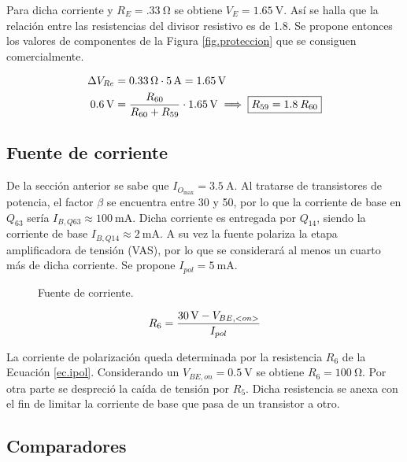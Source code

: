	Para dicha corriente y $R_{E} = \SI{.33}{\ohm}$ se obtiene $V_{E} = \SI{1.65}{\V}$. Así se halla que la relación entre las resistencias del divisor resistivo es de \num{1,8}. Se propone entonces los valores de componentes de la Figura \ref{fig.proteccion} que se consiguen comercialmente.

	\begin{align}
		\centering
		\Delta V_{Re} &= \SI{0.33}{\ohm} \cdot \SI{5}{\ampere} = \SI{1.65}{\volt} \\
		\SI{0.6}{\volt} &= \frac{R_{60}}{ R_{60} + R_{59} } \cdot \SI{1.65}{\volt} \implies \boxed{R_{59} = \num{1,8} \: R_{60}}
	\end{align}

		

\subsection{Fuente de corriente}
	De la sección anterior se sabe que $I_{O_{\max}}=\SI{3.5}{\A}$. Al tratarse de transistores de potencia, el factor $\beta$ se encuentra entre 30 y 50, por lo que la corriente de base en $Q_{63}$ sería $I_{B,Q63} \approx \SI{100}{\milli\ampere}$. Dicha corriente es entregada por $Q_{14}$, siendo la corriente de base $I_{B,Q14} \approx \SI{2}{\milli\ampere}$. A su vez la fuente polariza la etapa amplificadora de tensión (VAS), por lo que se considerará al menos un cuarto más de dicha corriente. Se propone $I_{pol} = \SI{5}{\milli\ampere}$.

	\begin{figure}[H]
		\centering
		\scalebox{0.5}{}
		\caption{Fuente de corriente.}
		\label{fig.fte}
	\end{figure}

\begin{equation}
	\centering
	R_6 = \frac{\SI{30}{\volt} - V_{BE, <on>} }{ I_{pol} }
	\label{ec.ipol}
\end{equation}

La corriente de polarización queda determinada por la resistencia $R_6$ de la Ecuación \ref{ec.ipol}. Considerando un $V_{BE,on} = \SI{0.5}{\volt}$ se obtiene $R_6 = \SI{100}{\ohm}$. Por otra parte se despreció la caída de tensión por $R_5$. Dicha resistencia se anexa con el fin de limitar la corriente de base que pasa de un transistor a otro.


\subsection{Comparadores}

